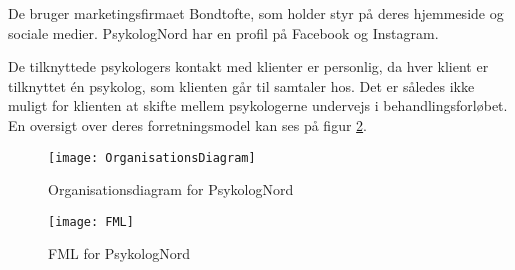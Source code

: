 De bruger marketingsfirmaet Bondtofte, som holder styr på deres hjemmeside og sociale medier.
PsykologNord har en profil på Facebook og Instagram.

De tilknyttede psykologers kontakt med klienter er personlig, da hver klient er tilknyttet én psykolog, som klienten går til samtaler hos.
Det er således ikke muligt for klienten at skifte mellem psykologerne undervejs i behandlingsforløbet.
En oversigt over deres forretningsmodel kan ses på figur \ref{forretning:fml}.

\begin{figure}[h]
    \caption{Organisationsdiagram for PsykologNord}
    \centering
        \texttt{[image: OrganisationsDiagram]}
    \label{forretning:organisationsdiagram}
\end{figure}

\begin{figure}[H]
    \caption{FML for PsykologNord}
    \centering
        \texttt{[image: FML]}
    \label{forretning:fml}
\end{figure}

